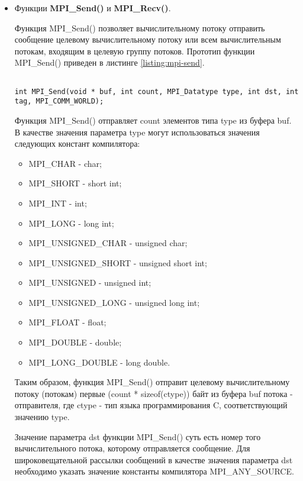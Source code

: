 \begin{itemize}

	\item Функции {\bf MPI\_Send()} и {\bf MPI\_Recv()}.

	Функция MPI\_Send() позволяет вычислительному потоку отправить сообщение целевому вычислительному потоку или всем вычислительным потокам, входящим в целевую группу потоков. Прототип функции MPI\_Send() приведен в листинге \ref{listing:mpi-send}.

\begin{lstlisting}

int MPI_Send(void * buf, int count, MPI_Datatype type, int dst, int tag, MPI_COMM_WORLD);

\end{lstlisting}
\mylistingend

	Функция MPI\_Send() отправляет count элементов типа type из буфера buf. В качестве значения параметра type могут использоваться значения следующих констант компилятора:

	\begin{itemize}

		\item MPI\_CHAR - char;
		\item MPI\_SHORT - short int;
		\item MPI\_INT - int;
		\item MPI\_LONG - long int;
		\item MPI\_UNSIGNED\_CHAR - unsigned char;
		\item MPI\_UNSIGNED\_SHORT - unsigned short int;
		\item MPI\_UNSIGNED - unsigned int;
		\item MPI\_UNSIGNED\_LONG - unsigned long int;
		\item MPI\_FLOAT - float;
		\item MPI\_DOUBLE - double;
		\item MPI\_LONG\_DOUBLE - long double.

	\end{itemize}

	Таким образом, функция MPI\_Send() отправит целевому вычислительному потоку (потокам) первые (count * sizeof(ctype)) байт из буфера buf потока - отправителя, где ctype - тип языка программирования C, соответствующий значению type.

	Значение параметра dst функции MPI\_Send() суть есть номер того вычислительного потока, которому отправляется сообщение. Для широковещательной рассылки сообщений в качестве значения параметра dst необходимо указать значение константы компилятора MPI\_ANY\_SOURCE.


\end{itemize}
